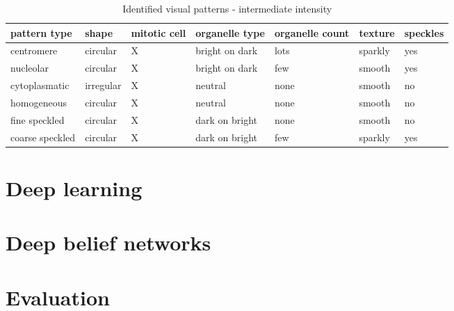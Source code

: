 \begin{table}
	\caption{Identified visual patterns - intermediate intensity}
	\label{tab:Vpatb}
	\small
	\begin{tabular}{|m{2.2cm}|m{1.4cm}|m{1.5cm}|m{1.5cm}|m{1.4cm}|m{1.6cm}|m{1.4cm}|}
		\hline
		\textbf{pattern type} & \textbf{shape} & \textbf{mitotic cell} & \textbf{organelle type} & \textbf{organelle count} & \textbf{texture} & \textbf{speckles} \\ \hline
		centromere & circular & X & bright on dark & lots & sparkly  & yes \\ \hline
		nucleolar & circular & X & bright on dark & few & smooth & yes \\ \hline
		cytoplasmatic & irregular & X & neutral & none & smooth  & no \\ \hline
		homogeneous & circular & X & neutral & none & smooth & no \\ \hline
		fine speckled & circular & X & dark on bright & none & smooth & no \\ \hline
		coarse speckled & circular & X & dark on bright & few & sparkly & yes \\ \hline
	\end{tabular}
	\normalsize
\end{table}



\section{Deep learning}






\section{Deep belief networks}






\section{Evaluation}

